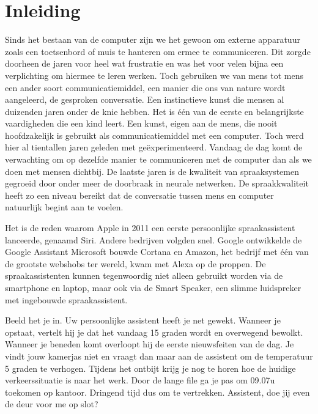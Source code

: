 
\chapter{Inleiding}
\label{ch:inleiding}
Sinds het bestaan van de computer zijn we het gewoon om externe apparatuur zoals een toetsenbord of muis te hanteren om ermee te communiceren. Dit zorgde doorheen de jaren voor heel wat frustratie en was het voor velen bijna een verplichting om hiermee te leren werken. Toch gebruiken we van mens tot mens een ander soort communicatiemiddel, een manier die ons van nature wordt aangeleerd, de gesproken conversatie.
Een instinctieve kunst die mensen al duizenden jaren onder de knie hebben. Het is één van de eerste en belangrijkste vaardigheden die een kind leert. Een kunst, eigen aan de mens, die nooit hoofdzakelijk is gebruikt als communicatiemiddel met een computer. Toch werd hier al tientallen jaren geleden met geëxperimenteerd. Vandaag de dag komt de verwachting om op dezelfde manier te communiceren met de computer dan als we doen met mensen dichtbij. De laatste jaren is de kwaliteit van spraaksystemen gegroeid door onder meer de doorbraak in neurale netwerken. De spraakkwaliteit heeft zo een niveau bereikt dat de conversatie tussen mens en computer natuurlijk begint aan te voelen.

Het is de reden waarom Apple in 2011 een eerste persoonlijke spraakassistent lanceerde, genaamd Siri. Andere bedrijven volgden snel. Google ontwikkelde de Google Assistant Microsoft bouwde Cortana en Amazon, het bedrijf met één van de grootste webshobs ter wereld, kwam met Alexa op de proppen. De spraakassistenten kunnen tegenwoordig niet alleen gebruikt worden via de smartphone en laptop, maar ook via de Smart Speaker, een slimme luidspreker met ingebouwde spraakassistent.

Beeld het je in. Uw persoonlijke assistent heeft je net gewekt. Wanneer je opstaat, vertelt hij je dat het vandaag 15 graden wordt en overwegend bewolkt. Wanneer je beneden komt overloopt hij de eerste nieuwsfeiten van de dag. Je vindt jouw kamerjas niet en vraagt dan maar aan de assistent om de temperatuur 5 graden te verhogen. Tijdens het ontbijt krijg je nog te horen hoe de huidige verkeerssituatie is naar het werk. Door de lange file ga je pas om 09.07u toekomen op kantoor. Dringend tijd dus om te vertrekken. Assistent, doe jij even de deur voor me op slot?

